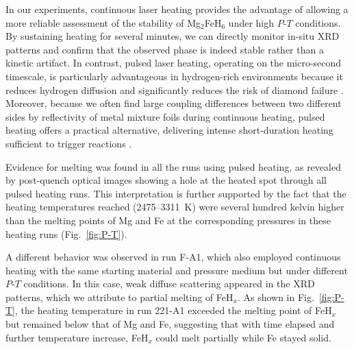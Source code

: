 \documentclass[draft,jgrga,12pt]{agujournal2019}
\begin{document}

In our experiments, continuous laser heating provides the advantage of allowing a more reliable assessment of the stability of Mg$_2$FeH$_6$ under high $P$-$T$ conditions. 
By sustaining heating for several minutes, we can directly monitor in-situ XRD patterns and confirm that the observed phase is indeed stable rather than a kinetic artifact.
In contrast, pulsed laser heating, operating on the micro-second timescale, is particularly advantageous in hydrogen-rich environments because it reduces hydrogen diffusion and significantly reduces the risk of diamond failure \cite{goncharov_xray_2010,horn_building_2025}. 
Moreover, because  we often find large coupling differences between two different sides by reflectivity of metal mixture foils during continuous heating, pulsed heating offers a practical alternative, delivering intense short-duration heating sufficient to trigger reactions \cite{ning_mechanism_2019}.


Evidence for melting was found in all the runs using pulsed heating, as revealed by post-quench optical images showing a hole at the heated spot through all pulsed heating runs. 
This interpretation is further supported by the fact that the heating temperatures reached (2475--3311~K) were several hundred kelvin higher than the melting points of Mg and Fe at the corresponding pressures in these heating runs (Fig.~\ref{fig:P-T}). 

A different behavior was observed in run F-A1, which also employed continuous heating with the same starting material and pressure medium but under different $P$-$T$ conditions. 
In this case, weak diffuse scattering appeared in the XRD patterns, which we attribute to partial melting of FeH$_x$. 
As shown in Fig.~\ref{fig:P-T}, the heating temperature in run 221-A1 exceeded the melting point of FeH$_x$ but remained below that of Mg and Fe, suggesting that with time elapsed and further temperature increase, FeH$_x$ could melt partially while Fe stayed solid.
\end{document}
